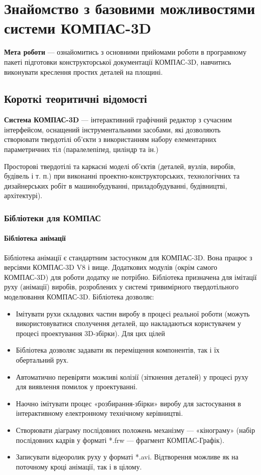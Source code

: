 \chapter[~]{Знайомство з базовими можливостями системи КОМПАС-3D}

\textbf{Мета роботи} --- ознайомитись з основними прийомами роботи в програмному пакеті підготовки
конструкторської документації КОМПАС-3D, навчитись виконувати креслення простих деталей на площині.

\section{Короткі теоритичні відомості}

\textbf{Система КОМПАС-3D} --- інтерактивний графічний редактор з сучасним інтерфейсом, оснащений
інструментальними засобами, які дозволяють створювати твердотілі об'єкти з використанням набору
елементарних параметричних тіл (паралелепіпед, циліндр та ін.)

Просторові твердотілі та каркасні моделі об'єктів (деталей, вузлів, виробів, будівель і т. п.) при
виконанні проектно-конструкторських, технологічних та дизайнерських робіт в машинобудуванні,
приладобудуванні, будівництві, архітектурі).

\subsection{Бібліотеки для КОМПАС}
\subsubsection{Бібліотека анімації}
Бібліотека анімації є стандартним застосунком для КОМПАС-3D. Вона працює з версіями КОМПАС-3D V8 і
вище. Додаткових модулів (окрім самого КОМПАС-3D) для роботи додатку не потрібно. Бібліотека
призначена для імітації руху (анімації) виробів, розроблених у системі тривимірного твердотільного
моделювання КОМПАС-3D. Бібліотека дозволяє:

\begin{itemize}
\item Імітувати рухи складових частин виробу в процесі реальної роботи (можуть використовуватися
  сполучення деталей, що накладаються користувачем у процесі проектування 3D-збірки). Для цих цілей
\item Бібліотека дозволяє задавати як переміщення компонентів, так і їх обертальний рух.
\item Автоматично перевіряти можливі колізії (зіткнення деталей) у процесі руху для виявлення
  помилок у проектуванні.
\item Наочно імітувати процес «розбирання-збірки» виробу для застосування в інтерактивному
  електронному технічному керівництві.
\item Створювати діаграму послідовних положень механізму — «кінограму» (набір послідовних кадрів у
  форматі *.frw — фрагмент КОМПАС-Графік).
\item Записувати відеоролик руху у форматі *.avi. Відтворення можливе як на поточному кроці
  анімації, так і в цілому.
\end{itemize}

